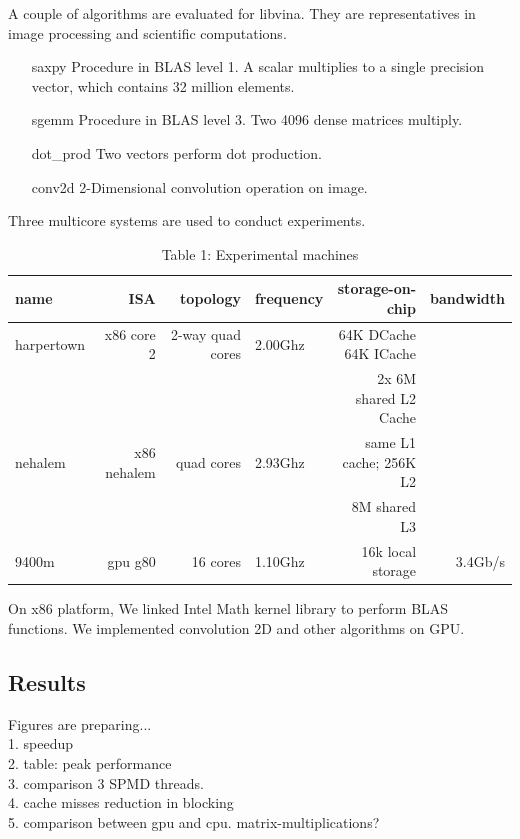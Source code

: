 \documentclass[10pt, conference, compsocconf]{IEEEtran}
\begin{document}
A couple of algorithms are evaluated for libvina.  They are representatives in image processing and scientific computations. 
\begin{itemize}
\item[saxpy] Procedure in BLAS level 1. A scalar multiplies to a single precision vector, which contains 32 million elements.
\item[sgemm] Procedure in BLAS level 3. Two 4096 dense matrices multiply.
\item[dot\_prod] Two vectors perform dot production.
\item[conv2d] 2-Dimensional convolution operation on image.
\end{itemize}

Three multicore systems are used to conduct experiments. 
\begin{table}[hb]
\caption{Table 1: Experimental machines}
\begin{center}
\begin{tabular}{|l|r|r|l|r|r|}
\hline
name       & ISA         & topology   & frequency  & storage-on-chip & bandwidth      \\
\hline 
harpertown & x86 core 2  & 2-way quad cores & 2.00Ghz & 64K DCache 64K ICache &         \\
           &             &                  &         & 2x 6M shared L2 Cache &         \\
\hline
nehalem    & x86 nehalem & quad cores       & 2.93Ghz & same L1 cache; 256K L2&         \\
           &             &                  &         & 8M shared L3          &         \\
\hline
9400m      & gpu g80     & 16 cores         & 1.10Ghz & 16k local storage     & 3.4Gb/s \\
\hline
\end{tabular} 
\end{center}
\end{table}
On x86 platform, We linked Intel Math kernel library to perform BLAS functions. We implemented convolution 2D and other algorithms on GPU. 

\subsection{Results}
Figures are preparing...\\
1. speedup\\
2. table: peak performance\\
3. comparison 3 SPMD threads.\\
4. cache misses reduction in blocking\\
5. comparison between gpu and cpu. matrix-multiplications?
\end{document}

